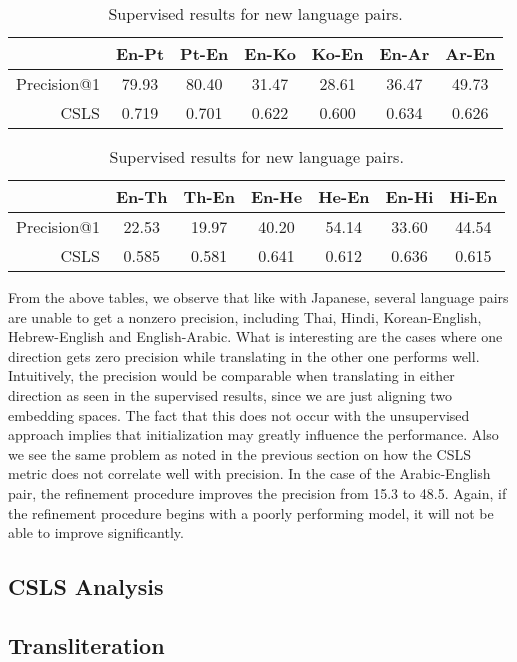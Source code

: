 \documentclass{article}
\begin{document}
\begin{table}[h]
  \centering
  \begin{tabular}{||r|cc|cc|cc||}
    \hline
    & En-Pt & Pt-En & En-Ko & Ko-En & En-Ar & Ar-En \\
    \hline
    Precision@1 & 79.93 & 80.40 & 31.47 & 28.61 & 36.47 & 49.73 \\
    CSLS        & 0.719 & 0.701 & 0.622 & 0.600 & 0.634 & 0.626 \\
    \hline
  \end{tabular}
  \begin{tabular}{||r|cc|cc|cc||}
    \hline
    & En-Th & Th-En & En-He & He-En & En-Hi & Hi-En \\
    \hline
    Precision@1 & 22.53 & 19.97 & 40.20 & 54.14 & 33.60 & 44.54 \\
    CSLS        & 0.585 & 0.581 & 0.641 & 0.612 & 0.636 & 0.615 \\
    \hline
  \end{tabular}
  \caption{Supervised results for new language pairs.}
\end{table}

From the above tables, we observe that like with Japanese, several
language pairs are unable to get a nonzero precision, including Thai,
Hindi, Korean-English, Hebrew-English and English-Arabic. What is
interesting are the cases where one direction gets zero precision
while translating in the other one performs well. Intuitively, the
precision would be comparable when translating in either direction as
seen in the supervised results, since we are just aligning two
embedding spaces. The fact that this does not occur with the
unsupervised approach implies that initialization may greatly influence
the performance. Also we see the same problem as noted in the previous
section on how the CSLS metric does not correlate well with precision.
In the case of the Arabic-English pair, the refinement procedure improves
the precision from 15.3 to 48.5. Again, if the refinement procedure
begins with a poorly performing model, it will not be able to improve
significantly.

\subsection*{CSLS Analysis}

\subsection*{Transliteration}
\end{document}
